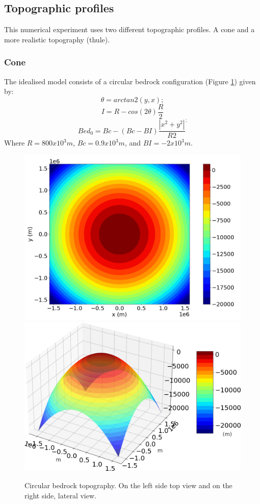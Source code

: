 \documentclass[a4paper,12pt]{article}
\begin{document}
\subsection{Topographic profiles}
This numerical experiment uses two different topographic profiles. A cone and a more realistic topography (thule).
\subsubsection{Cone}
	The idealised model consists of a circular bedrock configuration (Figure \ref{circular_topo_top}) given by:
	\begin{equation}
		\theta=arctan2(y,x);
	\end{equation}
	\begin{equation}
		I=R-cos(2\theta)\frac{R}{2}
	\end{equation}
	\begin{equation}
		Bed_0=Bc-(Bc-BI)\frac{|x^2+y^2|}{R2}^;
	\end{equation}
	Where $R=800x10^3 m$, $Bc=0.9 x 10^3 m$, and $BI=-2 x 10^3 m$. 
	\begin{figure}[!h]
		\centering
		\includegraphics[width=0.45\linewidth]{../fig/circular_topo_top}
		\includegraphics[width=0.45\linewidth]{../fig/circular_topo_jet}
		\caption{Circular bedrock topography. On the left side top view and on the right side, lateral view.}
		\label{circular_topo_top}
	\end{figure}
\end{document}
